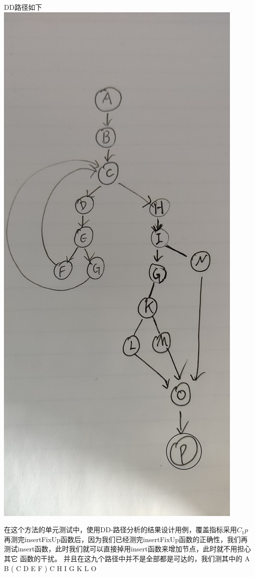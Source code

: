\documentclass[12pt, a4paper, oneside]{ctexart}
\begin{document}
\newpage

DD路径如下
\includegraphics[scale=0.06]{screenshots/DD-insert.jpg}

    在这个方法的单元测试中，使用DD-路径分析的结果设计用例，覆盖指标采用$C_1p$
    再测完insertFixUp函数后，因为我们已经测完insertFixUp函数的正确性，我们再测试insert函数，此时我们就可以直接掉用insert函数来增加节点，此时就不用担心其它
函数的干扰。
    并且在这九个路径中并不是全部都是可达的，我们测其中的
A B ( C D E F ) C H I G K L O
\end{document}
